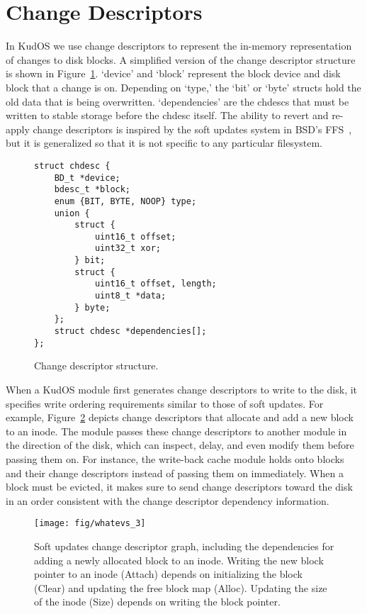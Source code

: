 \preparagraphspacing{}
\section*{Change Descriptors}
\label{sec:chdescs}

In KudOS we use change descriptors to represent the in-memory
representation of changes to disk blocks. A simplified version of the
change descriptor structure is shown in
Figure~\ref{fig:chdesc}. `device' and `block' represent the block
device and disk block that a change is on. Depending on `type,' the
`bit' or `byte' structs hold the old data that is being
overwritten. `dependencies' are the chdescs that must be written to
stable storage before the chdesc itself. The ability to revert and
re-apply change descriptors is inspired by the soft updates system in
BSD's FFS~\cite{ganger00soft}, but it is generalized so that it is not
specific to any particular filesystem.

\begin{figure}
{\footnotesize
\begin{verbatim}
struct chdesc {
    BD_t *device;
    bdesc_t *block;
    enum {BIT, BYTE, NOOP} type;
    union {
        struct {
            uint16_t offset;
            uint32_t xor;
        } bit;
        struct {
            uint16_t offset, length;
            uint8_t *data;
        } byte;
    };
    struct chdesc *dependencies[];
};
\end{verbatim}
}
\vspace{-14pt}
\caption{\label{fig:chdesc} Change descriptor structure.}
\end{figure}

When a KudOS module first generates change descriptors to write to the disk, it
specifies write ordering requirements similar to those of soft updates. For
example, Figure~\ref{fig:softupdates} depicts change descriptors that allocate
and add a new block to an inode.
%
The module passes these change descriptors to another module in the direction of
the disk, which can inspect, delay, and even modify them before passing them on.
%
For instance, the write-back cache module holds onto blocks and their change
descriptors instead of passing them on immediately.
%
When a block must be evicted, it makes sure to send change descriptors toward
the disk in an order consistent with the change descriptor dependency
information.

\begin{figure}[b]
  \centering
  \texttt{[image: fig/whatevs\_3]}%
  \caption{\label{fig:softupdates} Soft updates change descriptor graph,
  including the dependencies for adding a newly allocated block to an
  inode. Writing the new block pointer to an inode (Attach) depends on
  initializing the block (Clear) and updating the free block map (Alloc).
  Updating the size of the inode (Size) depends on writing the block
  pointer.}
\end{figure}


